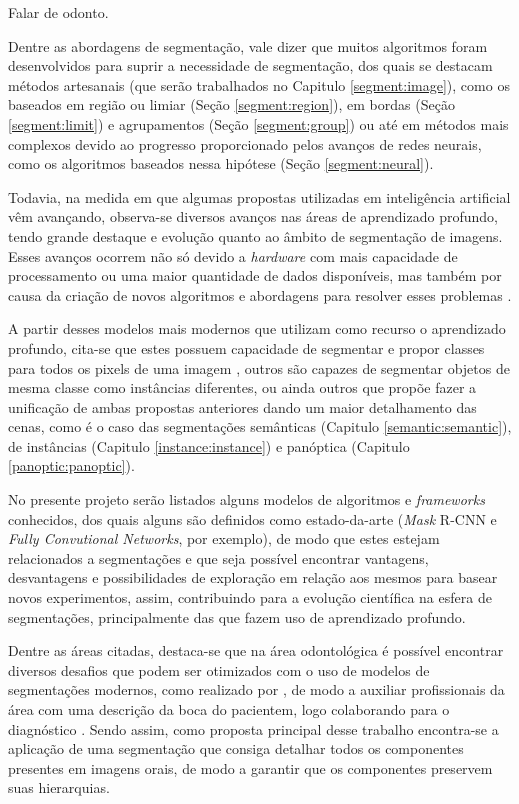 Falar de odonto.

Dentre as abordagens de segmentação, vale dizer que muitos algoritmos foram desenvolvidos para suprir a necessidade de segmentação, dos quais se destacam métodos artesanais (que serão trabalhados no Capitulo \ref{segment:image}), como os baseados em região ou limiar (Seção \ref{segment:region}), em bordas (Seção \ref{segment:limit}) e agrupamentos (Seção \ref{segment:group}) ou até em métodos mais complexos devido ao progresso proporcionado pelos avanços de redes neurais, como os algoritmos baseados nessa hipótese (Seção \ref{segment:neural}).

Todavia, na medida em que algumas propostas utilizadas em inteligência artificial vêm avançando, observa-se diversos avanços nas áreas de aprendizado profundo, tendo grande destaque e evolução quanto ao âmbito de segmentação de imagens. Esses avanços ocorrem não só devido a \textit{hardware} com mais capacidade de processamento ou uma maior quantidade de dados disponíveis, mas também por causa da criação de novos algoritmos e abordagens para resolver esses problemas \cite{Szegedy2015}.

A partir desses modelos mais modernos que utilizam como recurso o aprendizado profundo, cita-se que estes possuem capacidade de segmentar e propor classes para todos os pixels de uma imagem \cite{Minaee2021}, outros são capazes de segmentar objetos de mesma classe como instâncias diferentes, ou ainda outros que propõe fazer a unificação de ambas propostas anteriores dando um maior detalhamento das cenas, como é o caso das segmentações semânticas (Capitulo \ref{semantic:semantic}), de instâncias (Capitulo \ref{instance:instance}) e panóptica (Capitulo \ref{panoptic:panoptic}).

No presente projeto serão listados alguns modelos de algoritmos e \textit{frameworks} conhecidos, dos quais alguns são definidos como estado-da-arte (\textit{Mask} R-CNN e \textit{Fully Convutional Networks}, por exemplo), de modo que estes estejam relacionados a segmentações e que seja possível encontrar vantagens, desvantagens e possibilidades de exploração em relação aos mesmos para basear novos experimentos, assim, contribuindo para a evolução científica na esfera de segmentações, principalmente das que fazem uso de aprendizado profundo.

Dentre as áreas citadas, destaca-se que na área odontológica é possível encontrar diversos desafios que podem ser otimizados com o uso de modelos de segmentações modernos, como realizado por \cite{Ghazvinian2021, Minyoung2020}, de modo a auxiliar profissionais da área com uma descrição da boca do pacientem, logo colaborando para o diagnóstico \cite{Ghazvinian2021}. Sendo assim, como proposta principal desse trabalho encontra-se a aplicação de uma segmentação que consiga detalhar todos os componentes presentes em imagens orais, de modo a garantir que os componentes preservem suas hierarquias.

